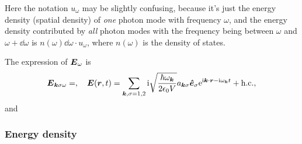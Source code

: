 \documentclass[hyperref, a4paper]{article}
\newcommand*{\ii}{\mathrm{i}}
\newcommand*{\ee}{\mathrm{e}}
\begin{document}
Here the notation $u_\omega$ may be slightly confusing,
because it's just the energy density (spatial density) of \emph{one} photon mode with frequency $\omega$, 
and the energy density contributed by \emph{all} photon modes 
with the frequency being between $\omega$ and $\omega + \dd{\omega}$
is $n(\omega) \dd{\omega} \cdot u_\omega$,
where $n(\omega)$ is the density of states. 

The expression of $\vb*{E}_\omega$ is 
\begin{equation}
    \vb*{E}_{\vb*{k} \sigma \omega} =  , \quad
    \vb*{E}(\vb*{r}, t) = \sum_{\vb*{k}, \sigma = 1, 2}
    \ii \sqrt{\frac{\hbar \omega_{\vb*{k}}}{2 \epsilon_0 V}} 
    a_{\vb*{k} \sigma} \vu*{e}_\sigma \ee^{\ii \vb*{k} \cdot \vb*{r} - \ii \omega_{\vb*{k}} t} + \text{h.c.},
\end{equation}
and 

\subsubsection{Energy density}
\end{document}
